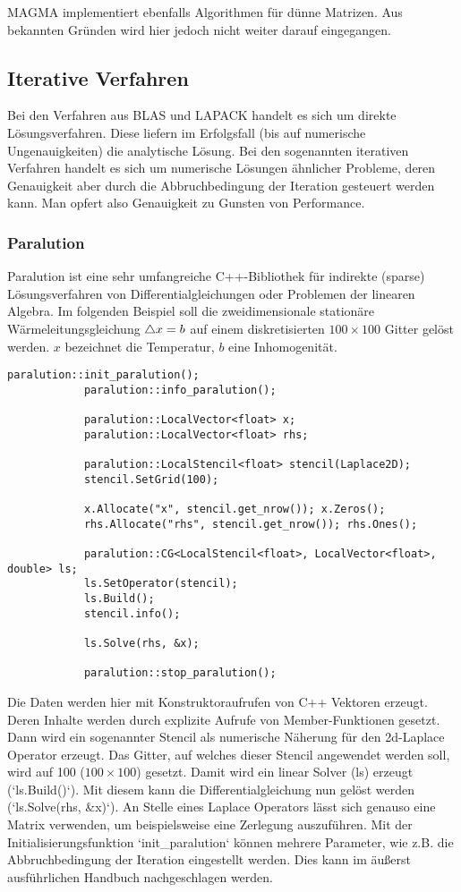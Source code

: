 		MAGMA implementiert ebenfalls Algorithmen für dünne Matrizen. Aus bekannten Gründen wird hier jedoch nicht weiter darauf eingegangen.
		
		\subsection{Iterative Verfahren}
		Bei den Verfahren aus BLAS und LAPACK handelt es sich um direkte Lösungsverfahren. Diese liefern im Erfolgsfall (bis auf numerische Ungenauigkeiten) die analytische Lösung. Bei den sogenannten iterativen Verfahren handelt es sich um numerische Lösungen ähnlicher Probleme, deren Genauigkeit aber durch die Abbruchbedingung der Iteration gesteuert werden kann. Man opfert also Genauigkeit zu Gunsten von Performance. 
		
			\subsubsection{Paralution}
			Paralution ist eine sehr umfangreiche C++-Bibliothek für indirekte (sparse) Lösungsverfahren von Differentialgleichungen oder Problemen der linearen Algebra. Im folgenden Beispiel soll die zweidimensionale stationäre Wärmeleitungsgleichung $\mathop{}\!\mathbin\bigtriangleup x = b$ auf einem diskretisierten $100\times 100$ Gitter gelöst werden. $x$ bezeichnet die Temperatur, $b$ eine Inhomogenität.
			\begin{lstlisting}[caption=Paralution Beispiel]		
			paralution::init_paralution();
			paralution::info_paralution();

			paralution::LocalVector<float> x;
			paralution::LocalVector<float> rhs;

			paralution::LocalStencil<float> stencil(Laplace2D);
			stencil.SetGrid(100);

			x.Allocate("x", stencil.get_nrow()); x.Zeros();
			rhs.Allocate("rhs", stencil.get_nrow()); rhs.Ones();

			paralution::CG<LocalStencil<float>, LocalVector<float>, double> ls;
			ls.SetOperator(stencil);
			ls.Build();
			stencil.info();

			ls.Solve(rhs, &x);

			paralution::stop_paralution();
			\end{lstlisting}
			
			Die Daten werden hier mit Konstruktoraufrufen von C++ Vektoren erzeugt. Deren Inhalte werden durch explizite Aufrufe von Member-Funktionen gesetzt. Dann wird ein sogenannter Stencil als numerische Näherung für den 2d-Laplace Operator erzeugt. Das Gitter, auf welches dieser Stencil angewendet werden soll, wird auf 100 ($100\times 100$) gesetzt. Damit wird ein linear Solver (ls) erzeugt (\li`ls.Build()`). Mit diesem kann die Differentialgleichung nun gelöst werden (\li`ls.Solve(rhs, &x)`). An Stelle eines Laplace Operators lässt sich genauso eine Matrix verwenden, um beispielsweise eine Zerlegung auszuführen. Mit der Initialisierungsfunktion \li`init_paralution` können mehrere Parameter, wie z.B. die Abbruchbedingung der Iteration eingestellt werden. Dies kann im äußerst ausführlichen Handbuch nachgeschlagen werden. \autocite{para}
			 
